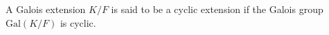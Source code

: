 \documentclass[12pt]{article}
\begin{document}
A Galois extension $K/F$ is said to be a cyclic extension if the Galois group $\textrm{Gal$(K/F)$}$ is cyclic.
\end{document}
